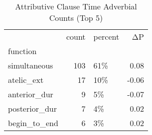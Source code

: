 \begin{table}[htbp!]
\centering
\caption{Attributive Clause Time Adverbial Counts (Top 5)}
\label{table:submod_func_cp}
\begin{tabular}{lrlr}
\toprule
{} &  count & percent &    ΔP \\
function      &        &         &       \\
\midrule
simultaneous  &    103 &     61\% &  0.08 \\
atelic\_ext    &     17 &     10\% & -0.06 \\
anterior\_dur  &      9 &      5\% & -0.07 \\
posterior\_dur &      7 &      4\% &  0.02 \\
begin\_to\_end  &      6 &      3\% &  0.02 \\
\bottomrule
\end{tabular}
\end{table}
